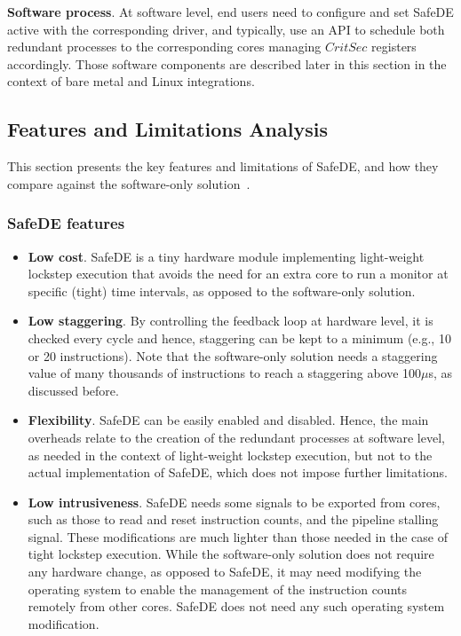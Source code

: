 \textbf{Software process}. At software level, end users need to configure and set SafeDE active with the corresponding driver, and typically, use an API to schedule both redundant processes to the corresponding cores managing $CritSec$ registers accordingly. Those software components are described later in this section in the context of bare metal and Linux integrations.


\subsection{Features and Limitations Analysis}

This section presents the key features and limitations of SafeDE, and how they compare against the software-only solution~\cite{SergiDFT}. 

\subsubsection{SafeDE features}
\begin{itemize}
\item \textbf{Low cost}. SafeDE is a tiny hardware module implementing light-weight lockstep execution that avoids the need for an extra core to run a monitor at specific (tight) time intervals, as opposed to the software-only solution.
\item \textbf{Low staggering}. By controlling the feedback loop at hardware level, it is checked every cycle and hence, staggering can be kept to a minimum (e.g., 10 or 20 instructions). Note that the software-only solution needs a staggering value of many thousands of instructions to reach a staggering above 100$\mu$s, as discussed before.
\item \textbf{Flexibility}. SafeDE can be easily enabled and disabled. Hence, the main overheads relate to the creation of the redundant processes at software level, as needed in the context of light-weight lockstep execution, but not to the actual implementation of SafeDE, which does not impose further limitations.
\item \textbf{Low intrusiveness}. SafeDE needs some signals to be exported from cores, such as those to read and reset instruction counts, and the pipeline stalling signal. These modifications are much lighter than those needed in the case of tight lockstep execution. While the software-only solution does not require any hardware change, as opposed to SafeDE, it may need modifying the operating system to enable the management of the instruction counts remotely from other cores. SafeDE does not need any such operating system modification.
\end{itemize}

